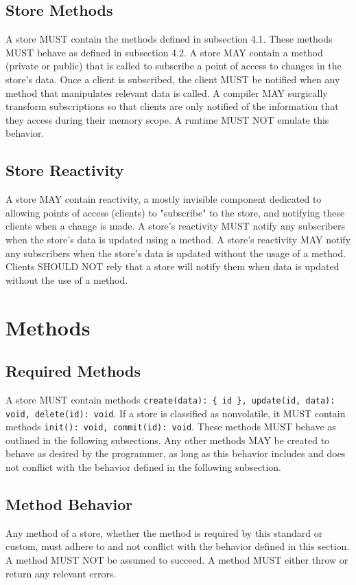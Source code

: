 \documentclass{article}
\begin{document}
\subsection{Store Methods}
A store MUST contain the methods defined in subsection 4.1. These methods MUST behave as defined in subsection 4.2. A store MAY contain a method (private or public) that is called to subscribe a point of access to changes in the store's data. Once a client is subscribed, the client MUST be notified when any method that manipulates relevant data is called. A compiler MAY surgically transform subscriptions so that clients are only notified of the information that they access during their memory scope. A runtime MUST NOT emulate this behavior.

\subsection{Store Reactivity}
A store MAY contain reactivity, a mostly invisible component dedicated to allowing points of access (clients) to "subscribe" to the store, and notifying these clients when a change is made. A store's reactivity MUST notify any subscribers when the store's data is updated using a method. A store's reactivity MAY notify any subscribers when the store's data is updated without the usage of a method. Clients SHOULD NOT rely that a store will notify them when data is updated without the use of a method.

\section{Methods}

\subsection{Required Methods}
A store MUST contain methods \verb|create(data): { id }, update(id, data): void, delete(id): void|. If a store is classified as nonvolatile, it MUST contain methods \verb|init(): void, commit(id): void|. These methods MUST behave as outlined in the following subsections. Any other methods MAY be created to behave as desired by the programmer, as long as this behavior includes and does not conflict with the behavior defined in the following subsection.

\subsection{Method Behavior}
Any method of a store, whether the method is required by this standard or custom, must adhere to and not conflict with the behavior defined in this section. A method MUST NOT be assumed to succeed. A method MUST either throw or return any relevant errors.
\end{document}
